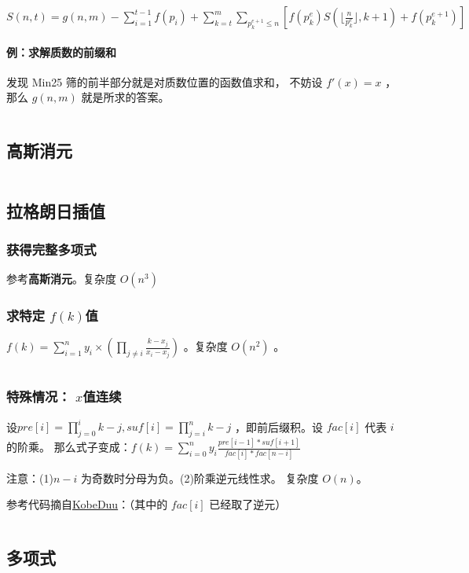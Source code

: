 \documentclass[a4paper,11pt]{article}
\begin{document}
\(S(n,t)=g(n,m)-\sum\limits_{i=1}^{t-1}f(p_i)+\sum\limits_{k=t}^{m} \sum\limits_{p_k^{e+1}\le n} {\left [f(p_k^e)S(\lfloor \frac{n}{p_k^e}\rfloor,k+1) + f(p_k^{e+1})\right]}\)

\paragraph{例：求解质数的前缀和}
\leavevmode

发现 Min25 筛的前半部分就是对质数位置的函数值求和，
不妨设 \(f'(x)=x\) ，那么 \(g(n,m)\) 就是所求的答案。

\inputminted[linenos]{c++}{math/min25sumprime.cpp}

\subsection{高斯消元}
\inputminted[linenos]{c++}{math/guass.cpp}
\subsection{拉格朗日插值}
\subsubsection{获得完整多项式}
参考\textbf{高斯消元}。复杂度 \(O(n^3)\)
\subsubsection{求特定 \texorpdfstring{\(f(k)\)} 的值}
\(f(k)=\sum\limits_{i=1}^{n}y_i\times (\prod\limits _{j\not=i}\frac{k-x_j}{x_i-x_j})\)
。复杂度 \(O(n^2)\) 。
\inputminted[linenos,breaklines]{c++}{math/lagelangri1.cpp}
\subsubsection{特殊情况： \texorpdfstring{\(x\)} 取值连续}
设\(pre[i]=\prod\limits_{j=0}^ik-j,suf[i]=\prod\limits_{j=i}^nk-j\)
，即前后缀积。设 \(fac[i]\) 代表 \(i\) 的阶乘。
那么式子变成：\(f(k)=\sum\limits_{i=0}^ny_i\frac{pre[i-1]*suf[i+1]}{fac[i]*fac[n-i]}\)

\noindent 注意：(1)\(n-i\) 为奇数时分母为负。(2)阶乘逆元线性求。 复杂度 \(O(n)\)。

\noindent 参考代码摘自\href{https://blog.csdn.net/qq_41157137/article/details/100593260}{KobeDuu}：（其中的
\(fac[i]\) 已经取了逆元）
\inputminted[linenos]{c++}{math/lagelangri2.cpp}

\subsection{多项式}
\end{document}
